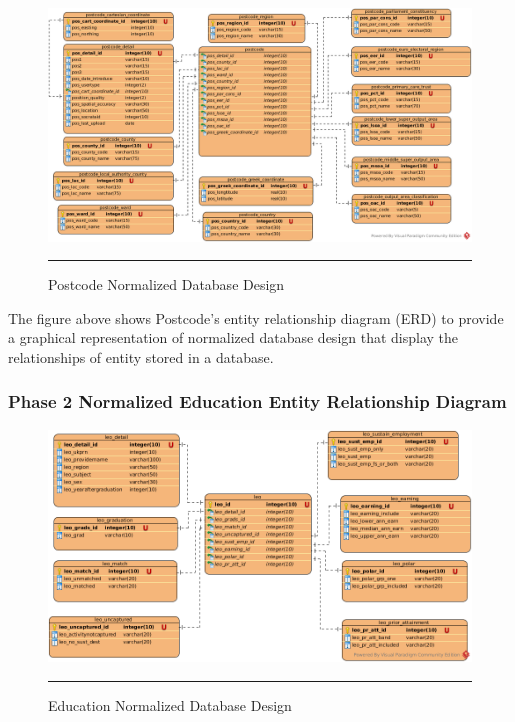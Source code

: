 \begin{figure}[H]
	\centering
	\includegraphics[width=1.0\textwidth]{FYP2/Chapter3/FYP2-Postcode-Normalized-ERD.png}
	\rule{35em}{0.5pt}
	\caption[Postcode Normalized Database Design]{Postcode Normalized Database Design}
\end{figure} 

The figure above shows Postcode's entity relationship diagram (ERD) to provide a graphical representation of normalized database design that display the relationships of entity stored in a database. 

\subsubsection{Phase 2 Normalized Education Entity Relationship Diagram} 

\begin{figure}[H]
	\centering
	\includegraphics[width=1.0\textwidth]{FYP2/Chapter3/FYP2-Education-Normalized-ERD.png}
	\rule{35em}{0.5pt}
	\caption[Education Normalized Database Design]{Education Normalized Database Design}
\end{figure} 

